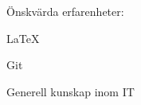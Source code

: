 \documentclass[10pt]{article}
\begin{document}
    
    
    Önskvärda erfarenheter:
    \begin{dashlist}
        \item \LaTeX
        \item Git
        \item Generell kunskap inom IT
    \end{dashlist}
        
    
\end{document}
